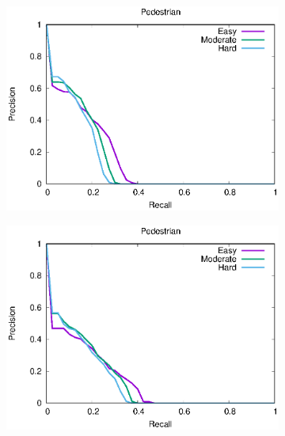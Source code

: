\begin{figure}[H]
\begin{subfigure}{.34\textwidth}
    \centering
    \includegraphics[width=1.0\linewidth]{img/yolo_Nov_4/plot_valid/pedestrian_detection.eps}
\end{subfigure}%
\begin{subfigure}{.34\textwidth}
    \centering
    \includegraphics[width=1.0\linewidth]{img/yolo_Nov_9/plot_valid/pedestrian_detection.eps}
\end{subfigure}%
\begin{subfigure}{.34\textwidth}
    \centering

\end{subfigure}
\end{figure}
